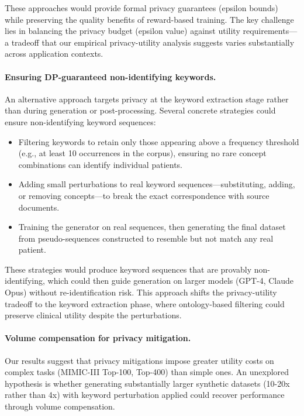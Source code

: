 These approaches would provide formal privacy guarantees (epsilon bounds) while preserving the quality benefits of reward-based training.
The key challenge lies in balancing the privacy budget (epsilon value) against utility requirements—a tradeoff that our empirical privacy-utility analysis suggests varies substantially across application contexts.

\paragraph{Ensuring DP-guaranteed non-identifying keywords.}

An alternative approach targets privacy at the keyword extraction stage rather than during generation or post-processing.
Several concrete strategies could ensure non-identifying keyword sequences:
\begin{itemize}
    \item Filtering keywords to retain only those appearing above a frequency threshold (e.g., at least 10 occurrences in the corpus), ensuring no rare concept combinations can identify individual patients.
    \item Adding small perturbations to real keyword sequences—substituting, adding, or removing concepts—to break the exact correspondence with source documents.
    \item Training the generator on real sequences, then generating the final dataset from pseudo-sequences constructed to resemble but not match any real patient.
\end{itemize}

These strategies would produce keyword sequences that are provably non-identifying, which could then guide generation on larger models (GPT-4, Claude Opus) without re-identification risk.
This approach shifts the privacy-utility tradeoff to the keyword extraction phase, where ontology-based filtering could preserve clinical utility despite the perturbations.

\paragraph{Volume compensation for privacy mitigation.}

Our results suggest that privacy mitigations impose greater utility costs on complex tasks (MIMIC-III Top-100, Top-400) than simple ones.
An unexplored hypothesis is whether generating substantially larger synthetic datasets (10-20x rather than 4x) with keyword perturbation applied could recover performance through volume compensation.

